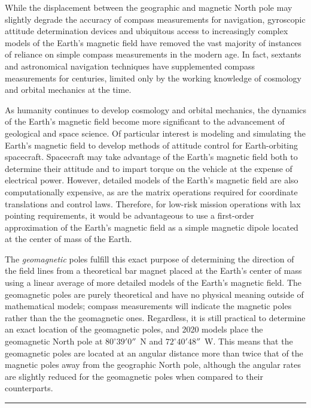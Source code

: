 \documentclass[10pt]{article}
\begin{document}
While the displacement between the geographic and magnetic North pole may slightly degrade the accuracy of compass measurements for navigation, gyroscopic attitude determination devices and ubiquitous access to increasingly complex models of the Earth's magnetic field have removed the vast majority of instances of reliance on simple compass measurements in the modern age. In fact, sextants and astronomical navigation techniques have supplemented compass measurements for centuries, limited only by the working knowledge of cosmology and orbital mechanics at the time.

As humanity continues to develop cosmology and orbital mechanics, the dynamics of the Earth's magnetic field become more significant to the advancement of geological and space science. Of particular interest is modeling and simulating the Earth's magnetic field to develop methods of attitude control for Earth-orbiting spacecraft. Spacecraft may take advantage of the Earth's magnetic field both to determine their attitude and to impart torque on the vehicle at the expense of electrical power. However, detailed models of the Earth's magnetic field are also computationally expensive, as are the matrix operations required for coordinate translations and control laws. Therefore, for low-risk mission operations with lax pointing requirements, it would be advantageous to use a first-order approximation of the Earth's magnetic field as a simple magnetic dipole located at the center of mass of the Earth.

The \textit{geomagnetic} poles fulfill this exact purpose of determining the direction of the field lines from a theoretical bar magnet placed at the Earth's center of mass using a linear average of more detailed models of the Earth's magnetic field. The geomagnetic poles are purely theoretical and have no physical meaning outside of mathematical models; compass measurements will indicate the magnetic poles rather than the the geomagnetic ones. Regardless, it is still practical to determine an exact location of the geomagnetic poles, and 2020 models place the geomagnetic North pole at \mbox{$80^{\circ} 39' 0''$ N} and \mbox{$72^{\circ} 40' 48''$ W}. This means that the geomagnetic poles are located at an angular distance more than twice that of the magnetic poles away from the geographic North pole, although the angular rates are slightly reduced for the geomagnetic poles when compared to their counterparts.

\begin{center}
\rule{\textwidth}{0.5pt}
\end{center}
\end{document}
